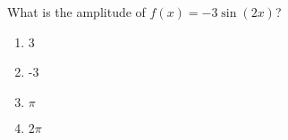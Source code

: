 \bigskip

\item What is the amplitude of $f(x)=-3\sin(2x)$?

\begin{enumerate}
\item 3
\item -3
\item $\pi$
\item $2\pi$
\end{enumerate}
